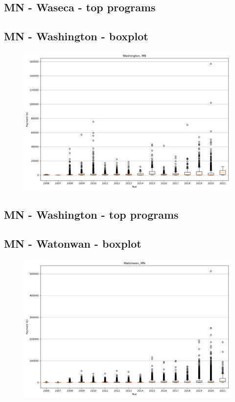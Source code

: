 \subsection*{MN - Waseca - top programs}

\newpage
\subsection*{MN - Washington - boxplot}
\begin{figure}[h]
\centering
\includegraphics[width=7in]{../output/boxplots/counties/Washington-MN_boxplot.png}
\end{figure}


\subsection*{MN - Washington - top programs}

\newpage
\subsection*{MN - Watonwan - boxplot}
\begin{figure}[h]
\centering
\includegraphics[width=7in]{../output/boxplots/counties/Watonwan-MN_boxplot.png}
\end{figure}


